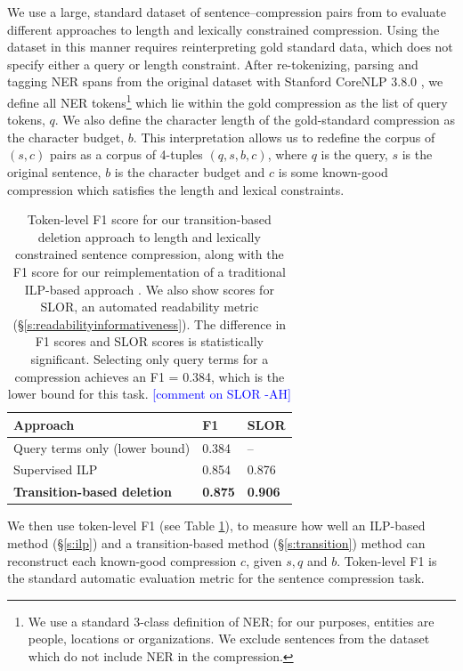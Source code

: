 \documentclass[11pt,a4paper]{article}
\newcommand{\ahcomment}[1]{\textcolor{blue}{[#1 -AH]}}
\begin{document}
We use a large, standard dataset of sentence--compression pairs from \citet{filippova2013overcoming} to evaluate different approaches to length and lexically constrained compression. Using the dataset in this manner requires reinterpreting gold standard data, which does not specify either a query or length constraint. After re-tokenizing, parsing and tagging NER spans from the original dataset with Stanford CoreNLP 3.8.0 \cite{corenlp}, we define all NER tokens\footnote{We use a standard 3-class definition of NER; for our purposes, entities are people, locations or organizations. We exclude sentences from the dataset which do not include NER in the compression.} which lie within the gold compression as the list of query tokens, $q$. We also define the character length of the gold-standard compression as the character budget, $b$. This interpretation allows us to redefine the corpus of $(s,c)$ pairs as a corpus of 4-tuples $(q,s,b,c)$, where $q$ is the query, $s$ is the original sentence, $b$ is the character budget and $c$ is some known-good compression which satisfies the length and lexical constraints. 

\begin{table}[]
\begin{tabular}{lll}
\centering
Approach & F1 & SLOR  \\ \hline
Query terms only {\small (lower bound)} & 0.384  & --   \\
Supervised ILP  &  0.854   &  0.876        \\
\textbf{Transition-based deletion} &  \textbf{0.875}  & \textbf{0.906}   \\
\end{tabular}
\caption{Token-level F1 score for our transition-based deletion approach to length and lexically constrained sentence compression, along with the F1 score for our reimplementation of a traditional ILP-based approach \cite{filippova2013overcoming}. We also show scores for SLOR, an automated readability metric (\S\ref{s:readabilityinformativeness}). The difference in F1 scores and SLOR scores  is statistically significant. Selecting only query terms for a compression achieves an F1 = 0.384, which is the lower bound for this task. \ahcomment{comment on SLOR}}
\label{t:results}
\end{table}


We then use token-level F1 (see Table \ref{t:results}), to measure how well an ILP-based method (\S\ref{s:ilp}) and a transition-based method (\S\ref{s:transition}) method can reconstruct each known-good compression $c$, given $s,q$ and $b$. Token-level F1 is the standard automatic evaluation metric for the sentence compression task. 
\end{document}
